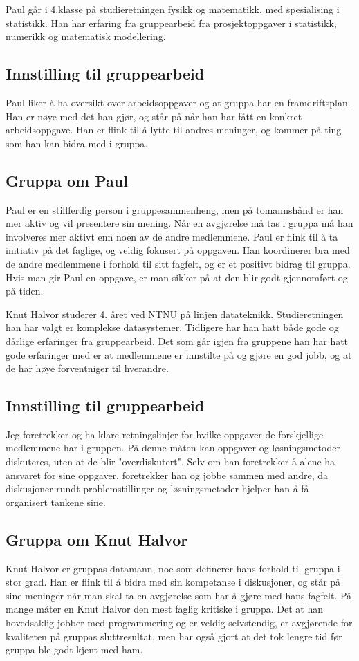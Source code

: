 Paul går i 4.klasse på studieretningen fysikk og matematikk, med spesialising i statistikk. Han har erfaring fra gruppearbeid fra prosjektoppgaver i statistikk, numerikk og matematisk modellering.

\subsection*{Innstilling til gruppearbeid}
Paul liker å ha oversikt over arbeidsoppgaver og at gruppa har en framdriftsplan. Han er nøye med det han gjør, og står på når han har fått en konkret arbeidsoppgave. Han er flink til å lytte til andres meninger, og kommer på ting som han kan bidra med i gruppa.

\subsection*{Gruppa om Paul}
Paul er en stillferdig person i gruppesammenheng, men på tomannshånd er han mer
aktiv og vil presentere sin mening. Når en avgjørelse må tas i gruppa må han
involveres mer aktivt enn noen av de andre medlemmene. Paul er flink til å ta 
initiativ på det faglige, og veldig fokusert på oppgaven. Han koordinerer bra 
med de andre medlemmene i forhold til sitt fagfelt, og er et positivt bidrag til
gruppa. Hvis man gir Paul en oppgave, er man sikker på at den blir godt
gjennomført og på tiden.

Knut Halvor studerer 4. året ved NTNU på linjen datateknikk. Studieretningen han 
har valgt er komplekse datasystemer. Tidligere har han hatt både gode og dårlige
erfaringer fra gruppearbeid. Det som går igjen fra gruppene han har hatt gode
erfaringer med er at medlemmene er innstilte på og gjøre en god jobb, og at de
har høye forventniger til hverandre.

\subsection*{Innstilling til gruppearbeid}
Jeg foretrekker og ha klare retningslinjer for hvilke oppgaver de forskjellige 
medlemmene har i gruppen. På denne måten kan oppgaver og løsningsmetoder diskuteres,
uten at de blir "overdiskutert". Selv om han foretrekker å alene ha ansvaret for sine oppgaver,
foretrekker han og jobbe sammen med andre, da diskusjoner rundt problemstillinger og
løsningsmetoder hjelper han å få organisert tankene sine.

\subsection*{Gruppa om Knut Halvor}
Knut Halvor er gruppas datamann, noe som definerer hans forhold til gruppa i
stor grad. Han er flink til å bidra med sin kompetanse i diskusjoner, og står på
sine meninger når man skal ta en avgjørelse som har å gjøre med hans fagfelt. På
mange måter en Knut Halvor den mest faglig kritiske i gruppa. Det at han hovedsaklig
jobber med programmering og er veldig selvstendig, er avgjørende for kvaliteten på 
gruppas sluttresultat, men har også gjort at det tok lengre tid før gruppa ble godt 
kjent med ham.

